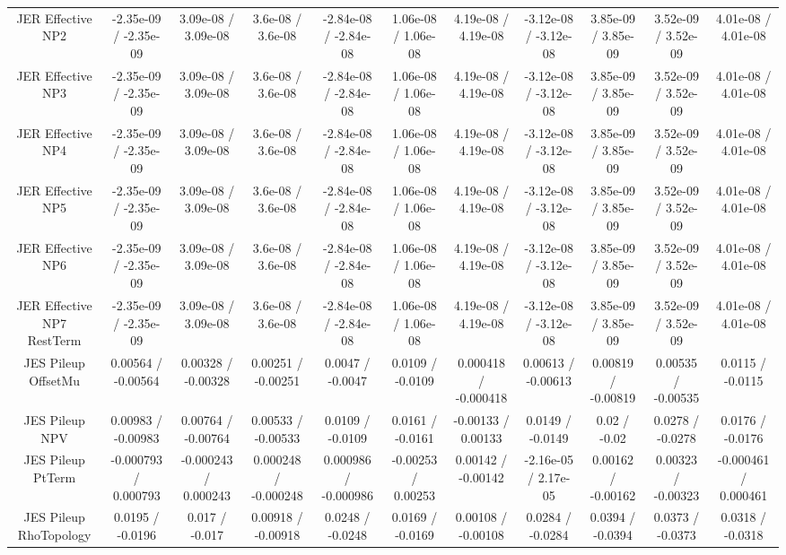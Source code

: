 \begin{table}[htbp]
\begin{center}
\begin{tabular}{|c|c|c|c|c|c|c|c|c|c|c|}
  JER Effective NP2 & -2.35e-09 / -2.35e-09 & 3.09e-08 / 3.09e-08 & 3.6e-08 / 3.6e-08 & -2.84e-08 / -2.84e-08 & 1.06e-08 / 1.06e-08 & 4.19e-08 / 4.19e-08 & -3.12e-08 / -3.12e-08 & 3.85e-09 / 3.85e-09 & 3.52e-09 / 3.52e-09 & 4.01e-08 / 4.01e-08 \\ 
  JER Effective NP3 & -2.35e-09 / -2.35e-09 & 3.09e-08 / 3.09e-08 & 3.6e-08 / 3.6e-08 & -2.84e-08 / -2.84e-08 & 1.06e-08 / 1.06e-08 & 4.19e-08 / 4.19e-08 & -3.12e-08 / -3.12e-08 & 3.85e-09 / 3.85e-09 & 3.52e-09 / 3.52e-09 & 4.01e-08 / 4.01e-08 \\ 
  JER Effective NP4 & -2.35e-09 / -2.35e-09 & 3.09e-08 / 3.09e-08 & 3.6e-08 / 3.6e-08 & -2.84e-08 / -2.84e-08 & 1.06e-08 / 1.06e-08 & 4.19e-08 / 4.19e-08 & -3.12e-08 / -3.12e-08 & 3.85e-09 / 3.85e-09 & 3.52e-09 / 3.52e-09 & 4.01e-08 / 4.01e-08 \\ 
  JER Effective NP5 & -2.35e-09 / -2.35e-09 & 3.09e-08 / 3.09e-08 & 3.6e-08 / 3.6e-08 & -2.84e-08 / -2.84e-08 & 1.06e-08 / 1.06e-08 & 4.19e-08 / 4.19e-08 & -3.12e-08 / -3.12e-08 & 3.85e-09 / 3.85e-09 & 3.52e-09 / 3.52e-09 & 4.01e-08 / 4.01e-08 \\ 
  JER Effective NP6 & -2.35e-09 / -2.35e-09 & 3.09e-08 / 3.09e-08 & 3.6e-08 / 3.6e-08 & -2.84e-08 / -2.84e-08 & 1.06e-08 / 1.06e-08 & 4.19e-08 / 4.19e-08 & -3.12e-08 / -3.12e-08 & 3.85e-09 / 3.85e-09 & 3.52e-09 / 3.52e-09 & 4.01e-08 / 4.01e-08 \\ 
  JER Effective NP7 RestTerm & -2.35e-09 / -2.35e-09 & 3.09e-08 / 3.09e-08 & 3.6e-08 / 3.6e-08 & -2.84e-08 / -2.84e-08 & 1.06e-08 / 1.06e-08 & 4.19e-08 / 4.19e-08 & -3.12e-08 / -3.12e-08 & 3.85e-09 / 3.85e-09 & 3.52e-09 / 3.52e-09 & 4.01e-08 / 4.01e-08 \\ 
  JES Pileup OffsetMu & 0.00564 / -0.00564 & 0.00328 / -0.00328 & 0.00251 / -0.00251 & 0.0047 / -0.0047 & 0.0109 / -0.0109 & 0.000418 / -0.000418 & 0.00613 / -0.00613 & 0.00819 / -0.00819 & 0.00535 / -0.00535 & 0.0115 / -0.0115 \\ 
  JES Pileup NPV & 0.00983 / -0.00983 & 0.00764 / -0.00764 & 0.00533 / -0.00533 & 0.0109 / -0.0109 & 0.0161 / -0.0161 & -0.00133 / 0.00133 & 0.0149 / -0.0149 & 0.02 / -0.02 & 0.0278 / -0.0278 & 0.0176 / -0.0176 \\ 
  JES Pileup PtTerm & -0.000793 / 0.000793 & -0.000243 / 0.000243 & 0.000248 / -0.000248 & 0.000986 / -0.000986 & -0.00253 / 0.00253 & 0.00142 / -0.00142 & -2.16e-05 / 2.17e-05 & 0.00162 / -0.00162 & 0.00323 / -0.00323 & -0.000461 / 0.000461 \\ 
  JES Pileup RhoTopology & 0.0195 / -0.0196 & 0.017 / -0.017 & 0.00918 / -0.00918 & 0.0248 / -0.0248 & 0.0169 / -0.0169 & 0.00108 / -0.00108 & 0.0284 / -0.0284 & 0.0394 / -0.0394 & 0.0373 / -0.0373 & 0.0318 / -0.0318 \\ 

\end{tabular}
\end{center}
\end{table}
